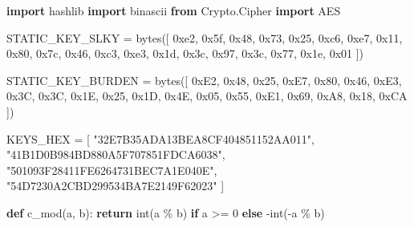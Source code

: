 \documentclass[
]{article}
\newenvironment{Shaded}{}{}
\newcommand{\BaseNTok}[1]{\textcolor[rgb]{0.25,0.63,0.44}{#1}}
\newcommand{\BuiltInTok}[1]{\textcolor[rgb]{0.00,0.50,0.00}{#1}}
\newcommand{\ControlFlowTok}[1]{\textcolor[rgb]{0.00,0.44,0.13}{\textbf{#1}}}
\newcommand{\DecValTok}[1]{\textcolor[rgb]{0.25,0.63,0.44}{#1}}
\newcommand{\ImportTok}[1]{\textcolor[rgb]{0.00,0.50,0.00}{\textbf{#1}}}
\newcommand{\KeywordTok}[1]{\textcolor[rgb]{0.00,0.44,0.13}{\textbf{#1}}}
\newcommand{\NormalTok}[1]{#1}
\newcommand{\OperatorTok}[1]{\textcolor[rgb]{0.40,0.40,0.40}{#1}}
\newcommand{\StringTok}[1]{\textcolor[rgb]{0.25,0.44,0.63}{#1}}
\begin{document}
\begin{Shaded}
\begin{Highlighting}[]

\ImportTok{import}\NormalTok{ hashlib}
\ImportTok{import}\NormalTok{ binascii}
\ImportTok{from}\NormalTok{ Crypto.Cipher }\ImportTok{import}\NormalTok{ AES}

\NormalTok{STATIC\_KEY\_SLKY }\OperatorTok{=} \BuiltInTok{bytes}\NormalTok{([}
    \BaseNTok{0xe2}\NormalTok{, }\BaseNTok{0x5f}\NormalTok{, }\BaseNTok{0x48}\NormalTok{, }\BaseNTok{0x73}\NormalTok{, }\BaseNTok{0x25}\NormalTok{, }\BaseNTok{0xc6}\NormalTok{, }\BaseNTok{0xe7}\NormalTok{, }\BaseNTok{0x11}\NormalTok{, }
    \BaseNTok{0x80}\NormalTok{, }\BaseNTok{0x7c}\NormalTok{, }\BaseNTok{0x46}\NormalTok{, }\BaseNTok{0xc3}\NormalTok{, }\BaseNTok{0xe3}\NormalTok{, }\BaseNTok{0x1d}\NormalTok{, }\BaseNTok{0x3c}\NormalTok{, }\BaseNTok{0x97}\NormalTok{, }
    \BaseNTok{0x3c}\NormalTok{, }\BaseNTok{0x77}\NormalTok{, }\BaseNTok{0x1e}\NormalTok{, }\BaseNTok{0x01}
\NormalTok{])}

\NormalTok{STATIC\_KEY\_BURDEN }\OperatorTok{=} \BuiltInTok{bytes}\NormalTok{([}
    \BaseNTok{0xE2}\NormalTok{, }\BaseNTok{0x48}\NormalTok{, }\BaseNTok{0x25}\NormalTok{, }\BaseNTok{0xE7}\NormalTok{, }\BaseNTok{0x80}\NormalTok{, }\BaseNTok{0x46}\NormalTok{, }\BaseNTok{0xE3}\NormalTok{, }\BaseNTok{0x3C}\NormalTok{,}
    \BaseNTok{0x3C}\NormalTok{, }\BaseNTok{0x1E}\NormalTok{, }\BaseNTok{0x25}\NormalTok{, }\BaseNTok{0x1D}\NormalTok{, }\BaseNTok{0x4E}\NormalTok{, }\BaseNTok{0x05}\NormalTok{, }\BaseNTok{0x55}\NormalTok{, }\BaseNTok{0xE1}\NormalTok{,}
    \BaseNTok{0x69}\NormalTok{, }\BaseNTok{0xA8}\NormalTok{, }\BaseNTok{0x18}\NormalTok{, }\BaseNTok{0xCA}
\NormalTok{])}

\NormalTok{KEYS\_HEX }\OperatorTok{=}\NormalTok{ [}
    \StringTok{"32E7B35ADA13BEA8CF404851152AA011"}\NormalTok{,}
    \StringTok{"41B1D0B984BD880A5F707851FDCA6038"}\NormalTok{,}
    \StringTok{"501093F28411FE6264731BEC7A1E040E"}\NormalTok{,}
    \StringTok{"54D7230A2CBD299534BA7E2149F62023"}
\NormalTok{]}

\KeywordTok{def}\NormalTok{ c\_mod(a, b):}
    \ControlFlowTok{return} \BuiltInTok{int}\NormalTok{(a }\OperatorTok{\%}\NormalTok{ b) }\ControlFlowTok{if}\NormalTok{ a }\OperatorTok{\textgreater{}=} \DecValTok{0} \ControlFlowTok{else} \OperatorTok{{-}}\BuiltInTok{int}\NormalTok{(}\OperatorTok{{-}}\NormalTok{a }\OperatorTok{\%}\NormalTok{ b)}


\end{Highlighting}
\end{Shaded}
\end{document}
